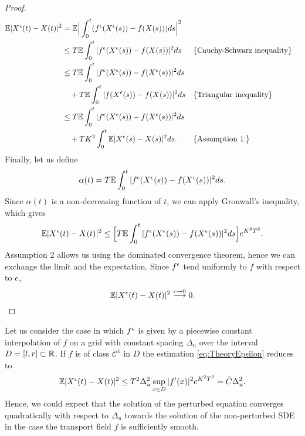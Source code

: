 \begin{proof}
\begin{equation*}
\begin{aligned}
	\mathbb{E} |X^\epsilon(t) - X(t)|^2  &= \mathbb{E} \Big|\int_0^t (f^\epsilon (X^\epsilon(s)) - f(X(s)))ds \Big|^2 \\
	&\leq T \mathbb{E} \int_0^t |f^\epsilon (X^\epsilon(s)) - f(X(s))|^2 ds   && \{\text{Cauchy-Schwarz inequality}\}\\
	&\leq T \mathbb{E} \int_0^t |f^\epsilon (X^\epsilon(s)) - f(X^\epsilon(s))|^2 ds \\
	&\quad + T \mathbb{E} \int_0^t |f (X^\epsilon(s)) - f(X(s))|^2 ds && \{\text{Triangular inequality}\} \\
	&\leq T \mathbb{E} \int_0^t |f^\epsilon (X^\epsilon(s)) - f(X^\epsilon(s))|^2 ds \\
	&\quad + TK^2 \int_0^t \mathbb{E}|X^\epsilon(s) - X(s)|^2ds. && \{\text{Assumption 1.}\} 
\end{aligned} 
\end{equation*}
Finally, let us define 
\begin{equation*}
	\alpha(t) = T \mathbb{E} \int_0^t |f^\epsilon (X^\epsilon(s)) - f(X^\epsilon(s))|^2 ds.
\end{equation*}
Since $\alpha(t)$ is a non-decreasing function of $t$, we can apply Gronwall's inequality, which gives 
\begin{equation}\label{eq:TheoryEpsilon}
	\mathbb{E} |X^\epsilon(t) - X(t)|^2 \leq  \Big[ T \mathbb{E} \int_0^t |f^\epsilon (X^\epsilon(s)) - f(X^\epsilon(s))|^2 ds \Big] e^{K^2T^2}.
\end{equation}
Assumption 2 allows us using the dominated convergence theorem, hence we can exchange the limit and the expectation. Since $f^\epsilon$ tend uniformly to $f$ with respect to $\epsilon$, 
\begin{equation*}
	\mathbb{E} |X^\epsilon(t) - X(t)|^2 \stackrel{\epsilon \rightarrow 0}\longrightarrow 0.
\end{equation*}
\end{proof}
\noindent Let us consider the case in which $f^\epsilon$ is given by a piecewise constant interpolation of $f$ on a grid with constant spacing $\Delta_u$ over the interval $D = \left[l,r\right] \subset \mathbb{R}$. If $f$ is of class $\mathcal{C}^1$ in $D$ the estimation \eqref{eq:TheoryEpsilon} reduces to
\begin{equation}
	\mathbb{E} |X^\epsilon(t) - X(t)|^2 \leq T^2 \Delta_u^2 \sup_{x\in D} |f'(x)|^2 e^{K^2 T^2} = \tilde{C} \Delta_u^2.
\end{equation}
Hence, we could expect that the solution of the perturbed equation converges quadratically with respect to $\Delta_u$ towards the solution of the non-perturbed SDE in the case the transport field $f$ is sufficiently smooth.
